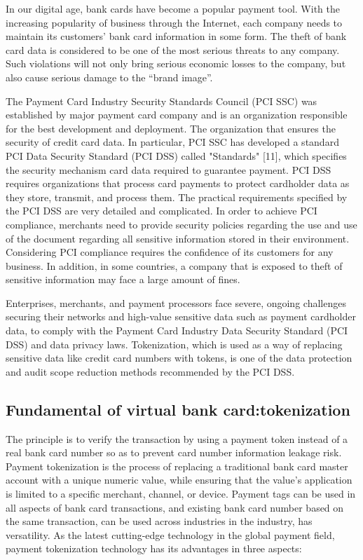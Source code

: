 \documentclass[journal]{IEEEtran}
\begin{document}
In our digital age, bank cards have become a popular payment tool. With the increasing popularity of business through the Internet, each company needs to maintain its customers' bank card information in some form. The theft of bank card data is considered to be one of the most serious threats to any company. Such violations will not only bring serious economic losses to the company, but also cause serious damage to the “brand image”.

The Payment Card Industry Security Standards Council (PCI SSC) was established by major payment card company and is an organization responsible for the best development and deployment. The organization that ensures the security of credit card data. In particular, PCI SSC has developed a standard PCI Data Security Standard (PCI DSS) called "Standards" [11], which specifies the security mechanism card data required to guarantee payment. PCI DSS requires organizations that process card payments to protect cardholder data as they store, transmit, and process them. The practical requirements specified by the PCI DSS are very detailed and complicated. In order to achieve PCI compliance, merchants need to provide security policies regarding the use and use of the document regarding all sensitive information stored in their environment. Considering PCI compliance requires the confidence of its customers for any business. In addition, in some countries, a company that is exposed to theft of sensitive information may face a large amount of fines.

Enterprises, merchants, and payment processors face severe, ongoing challenges securing their networks and high-value sensitive data such as payment cardholder data, to comply with the Payment Card Industry Data Security Standard (PCI DSS) and data privacy laws. Tokenization, which is used as a way of replacing sensitive data like credit card numbers with tokens, is one of the data protection and audit scope reduction methods recommended by the PCI DSS. 



\subsection{Fundamental of virtual bank card:tokenization }


The principle is to verify the transaction by using a payment token instead of a real bank card number so as to prevent card number information leakage risk. Payment tokenization is the process of replacing a traditional bank card master account with a unique numeric value, while ensuring that the value's application is limited to a specific merchant, channel, or device. Payment tags can be used in all aspects of bank card transactions, and existing bank card number based on the same transaction, can be used across industries in the industry, has versatility.
As the latest cutting-edge technology in the global payment field, payment tokenization technology has its advantages in three aspects:
\end{document}
